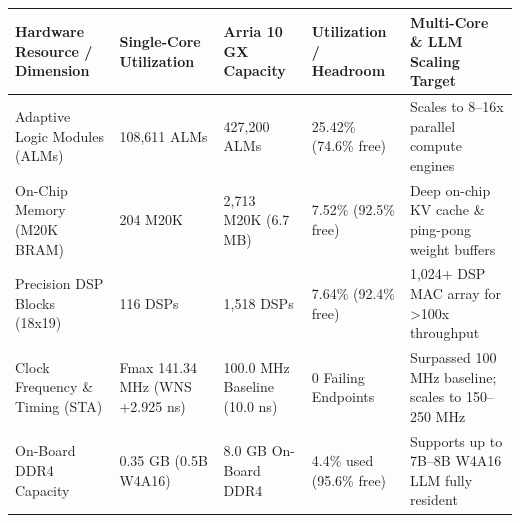 \documentclass[11pt,a4paper]{article}
\begin{document}
{\footnotesize\renewcommand{\arraystretch}{1.14}\begin{longtable}{@{}L{0.21\textwidth}L{0.16\textwidth}L{0.16\textwidth}L{0.15\textwidth}L{0.22\textwidth}@{}}\toprule

\textbf{Hardware Resource /\allowbreak{} Dimension} & \textbf{Single-Core Utilization} & \textbf{Arria 10 GX Capacity} & \textbf{Utilization /\allowbreak{} Headroom} & \textbf{Multi-Core \& LLM Scaling Target}\\\midrule\endhead

Adaptive Logic Modules (\allowbreak{}ALMs)\allowbreak{} & 108,\allowbreak{}611 ALMs & 427,\allowbreak{}200 ALMs & 25.42\% (\allowbreak{}74.6\% free)\allowbreak{} & Scales to 8--16x parallel compute engines\\[2pt]

On-Chip Memory (\allowbreak{}M20K BRAM)\allowbreak{} & 204 M20K & 2,\allowbreak{}713 M20K (\allowbreak{}6.7 MB)\allowbreak{} & 7.52\% (\allowbreak{}92.5\% free)\allowbreak{} & Deep on-chip KV cache \& ping-pong weight buffers\\[2pt]

Precision DSP Blocks (\allowbreak{}18x19)\allowbreak{} & 116 DSPs & 1,\allowbreak{}518 DSPs & 7.64\% (\allowbreak{}92.4\% free)\allowbreak{} & 1,\allowbreak{}024+\allowbreak{} DSP MAC array for >100x throughput\\[2pt]

Clock Frequency \& Timing (\allowbreak{}STA)\allowbreak{} & Fmax 141.34 MHz (\allowbreak{}WNS +\allowbreak{}2.925 ns)\allowbreak{} & 100.0 MHz Baseline (\allowbreak{}10.0 ns)\allowbreak{} & 0 Failing Endpoints & Surpassed 100 MHz baseline; scales to 150--250 MHz\\[2pt]

On-Board DDR4 Capacity & 0.35 GB (\allowbreak{}0.5B W4A16)\allowbreak{} & 8.0 GB On-Board DDR4 & 4.4\% used (\allowbreak{}95.6\% free)\allowbreak{} & Supports up to 7B--8B W4A16 LLM fully resident\\[2pt]

\bottomrule\end{longtable}}
\end{document}
